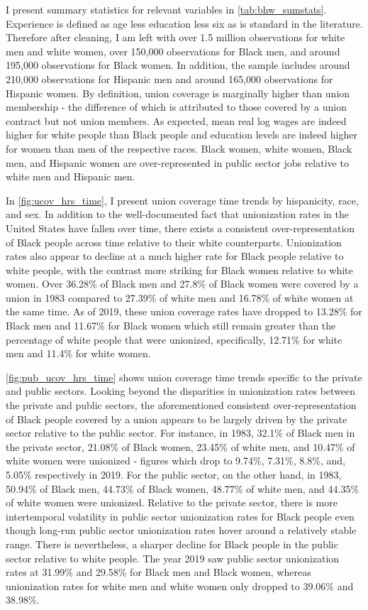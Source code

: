 \documentclass[11pt]{article}
\begin{document}
I present summary statistics for relevant variables in \autoref{tab:bhw_sumstats}. Experience is defined as age less education less six as is standard in the literature. Therefore after cleaning, I am left with over 1.5 million observations for white men and white women, over 150,000 observations for Black men, and around 195,000 observations for Black women. In addition, the sample includes around 210,000 observations for Hispanic men and around 165,000 observations for Hispanic women. By definition, union coverage is marginally higher than union membership - the difference of which is attributed to those covered by a union contract but not union members. As expected, mean real log wages are indeed higher for white people than Black people and education levels are indeed higher for women than men of the respective races. Black women, white women, Black men, and Hispanic women are over-represented in public sector jobs relative to white men and Hispanic men. 

In \autoref{fig:ucov_hrs_time}, I present union coverage time trends by hispanicity, race, and sex. In addition to the well-documented fact that unionization rates in the United States have fallen over time, there exists a consistent over-representation of Black people across time relative to their white counterparts. Unionization rates also appear to decline at a much higher rate for Black people relative to white people, with the contrast more striking for Black women relative to white women. Over 36.28\% of Black men and 27.8\% of Black women were covered by a union in 1983 compared to 27.39\% of white men and 16.78\% of white women at the same time. As of 2019, these union coverage rates have dropped to 13.28\% for Black men and 11.67\% for Black women which still remain greater than the percentage of white people that were unionized, specifically, 12.71\% for white men and 11.4\% for white women. 

\autoref{fig:pub_ucov_hrs_time} shows union coverage time trends specific to the private and public sectors. Looking beyond the disparities in unionization rates between the private and public sectors, the aforementioned consistent over-representation of Black people covered by a union appears to be largely driven by the private sector relative to the public sector. For instance, in 1983, 32.1\% of Black men in the private sector, 21.08\% of Black women, 23.45\% of white men, and 10.47\% of white women were unionized - figures which drop to 9.74\%, 7.31\%, 8.8\%, and, 5.05\% respectively in 2019. For the public sector, on the other hand, in 1983, 50.94\% of Black men, 44.73\% of Black women, 48.77\% of white men, and 44.35\% of white women were unionized. Relative to the private sector, there is more intertemporal volatility in public sector unionization rates for Black people even though long-run public sector unionization rates hover around a relatively stable range. There is nevertheless, a sharper decline for Black people in the public sector relative to white people. The year 2019 saw public sector unionization rates at 31.99\% and 29.58\% for Black men and Black women, whereas unionization rates for white men and white women only dropped to 39.06\% and 38.98\%.
\end{document}

